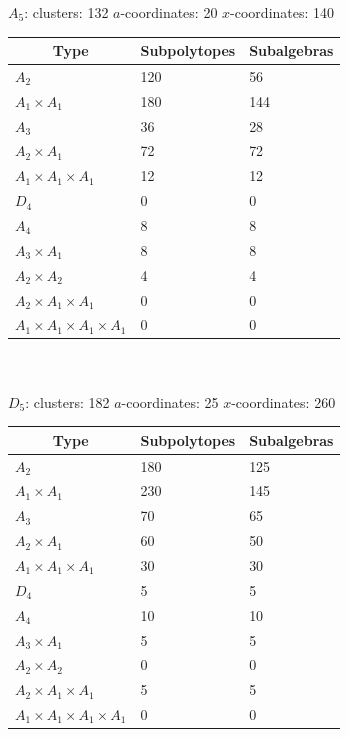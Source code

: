 \documentclass[11pt]{article}
\begin{document}
{\Large\underline{\(A_5\)}:} \quad clusters: 132 \qquad \(a\)-coordinates: 20 \qquad \(x\)-coordinates: 140\\

\begin{tabular}{ | l | l | l |}
\multicolumn{1}{c}{Type} &  \multicolumn{1}{c}{Subpolytopes}  &  \multicolumn{1}{c}{Subalgebras} \\
\hline \(A_2\) & 120 & 56 \\ 
\hline \(A_1 \times A_1\) & 180 & 144 \\ \hline 
\hline \(A_3\) & 36 & 28 \\ 
\hline \(A_2 \times A_1\) & 72 & 72 \\ 
\hline \(A_1 \times A_1 \times A_1\) & 12 & 12 \\ \hline 
\hline \(D_4\) & 0 & 0 \\ 
\hline \(A_4\) & 8 & 8 \\ 
\hline \(A_3 \times A_1\) & 8 & 8 \\ 
\hline \(A_2 \times A_2\) & 4 & 4 \\ 
\hline \(A_2 \times A_1 \times A_1\) & 0 & 0 \\ 
\hline \(A_1 \times A_1 \times A_1 \times A_1\) & 0 & 0 \\ 
\hline
\end{tabular} \\ \\


{\Large\underline{\(D_5\)}:} \quad clusters: 182 \qquad \(a\)-coordinates: 25 \qquad \(x\)-coordinates: 260\\

\begin{tabular}{ | l | l | l |} 
\multicolumn{1}{c}{Type} &  \multicolumn{1}{c}{Subpolytopes}  &  \multicolumn{1}{c}{Subalgebras} \\
\hline \(A_2\) & 180 & 125 \\ 
\hline \(A_1 \times A_1\) & 230 & 145 \\ \hline 
\hline \(A_3\) & 70 & 65 \\ 
\hline \(A_2 \times A_1\) & 60 & 50 \\ 
\hline \(A_1 \times A_1 \times A_1\) & 30 & 30 \\ \hline 
\hline \(D_4\) & 5 & 5 \\ 
\hline \(A_4\) & 10 & 10 \\ 
\hline \(A_3 \times A_1\) & 5 & 5 \\ 
\hline \(A_2 \times A_2\) & 0 & 0 \\ 
\hline \(A_2 \times A_1 \times A_1\) & 5 & 5 \\ 
\hline \(A_1 \times A_1 \times A_1 \times A_1\) & 0 & 0 \\ 
\hline
\end{tabular} \\ \\ 
\end{document}
